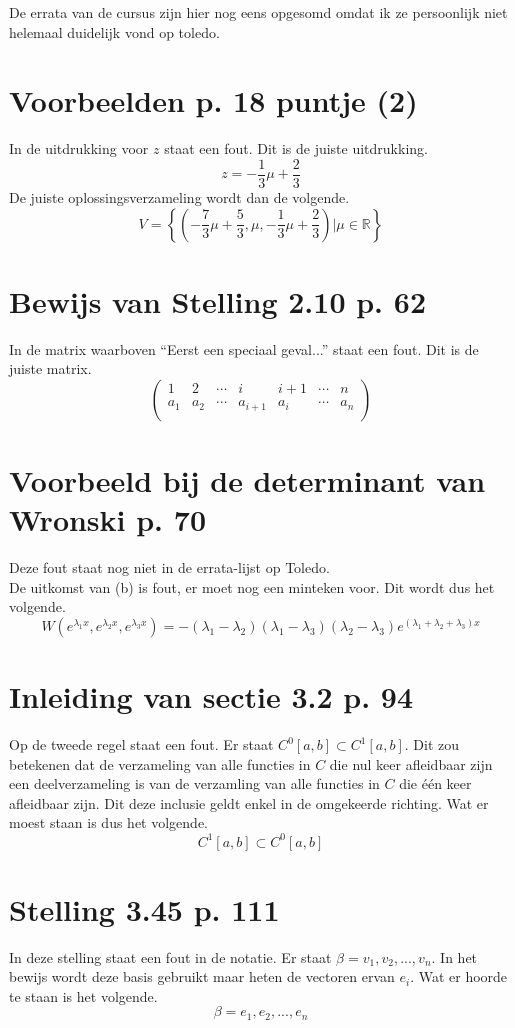 \documentclass[lineaire_algebra_oplossingen.tex]{subfiles}
\begin{document}
\noindent De errata van de cursus zijn hier nog eens opgesomd omdat ik ze persoonlijk niet helemaal duidelijk vond op toledo.

\section{Voorbeelden p. 18 puntje (2)}
In de uitdrukking voor $z$ staat een fout. Dit is de juiste uitdrukking.
\[
z = -\frac{1}{3}\mu + \frac{2}{3}
\]
De juiste oplossingsverzameling wordt dan de volgende.
\[
V = \left\{\left(-\frac{7}{3}\mu+\frac{5}{3},\mu,-\frac{1}{3}\mu + \frac{2}{3}\right) | \mu \in \mathbb{R}\right\}
\]

\section{Bewijs van Stelling 2.10 p. 62}
In de matrix waarboven ``Eerst een speciaal geval...'' staat een fout. Dit is de juiste matrix.
\[
\begin{pmatrix}
1 & 2 & \cdots & i & i+1 & \cdots & n\\
a_1 & a_2 & \cdots & a_{i+1} & a_i & \cdots & a_n\\ 
\end{pmatrix}
\]

\section{Voorbeeld bij de determinant van Wronski p. 70}
Deze fout staat nog niet in de errata-lijst op Toledo.\\
De uitkomst van (b) is fout, er moet nog een minteken voor. Dit wordt dus het volgende.
\[
W(e^{\lambda_1x}, e^{\lambda_2x}, e^{\lambda_3x}) = -(\lambda_1-\lambda_2) (\lambda_1-\lambda_3) (\lambda_2-\lambda_3)
e^{(\lambda_1 + \lambda_2 + \lambda_3)x}
\]

\section{Inleiding van sectie 3.2 p. 94}
Op de tweede regel staat een fout. Er staat $C^0[a,b] \subset C^1[a,b]$.
Dit zou betekenen dat de verzameling van alle functies in $C$ die nul keer afleidbaar zijn een deelverzameling is van de verzamling van alle functies in $C$ die \'e\'en keer afleidbaar zijn.
Dit deze inclusie geldt enkel in de omgekeerde richting. Wat er moest staan is dus het volgende.
\[
C^1[a,b] \subset C^0[a,b]
\]

\section{Stelling 3.45 p. 111}
In deze stelling staat een fout in de notatie. Er staat $\beta = v_1,v_2,...,v_n$.
In het bewijs wordt deze basis gebruikt maar heten de vectoren ervan $e_i$.
Wat er hoorde te staan is het volgende.
\[
\beta = e_1,e_2,...,e_n
\]
\end{document}
